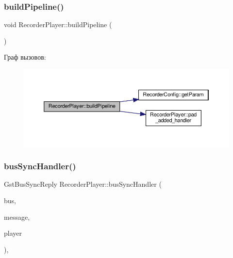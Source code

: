 \subsubsection{\texorpdfstring{build\+Pipeline()}{buildPipeline()}}
{\footnotesize\ttfamily void Recorder\+Player\+::build\+Pipeline (\begin{DoxyParamCaption}{ }\end{DoxyParamCaption})\hspace{0.3cm}{\ttfamily [private]}}

Граф вызовов\+:\nopagebreak
\begin{figure}[H]
\begin{center}
\leavevmode
\includegraphics[width=350pt]{class_recorder_player_a2406c730cc930fb3aa800142c041a950_cgraph}
\end{center}
\end{figure}
\mbox{\label{class_recorder_player_adb7a205e6752a5a88e23f5595508ad98}} 
\subsubsection{\texorpdfstring{bus\+Sync\+Handler()}{busSyncHandler()}}
{\footnotesize\ttfamily Gst\+Bus\+Sync\+Reply Recorder\+Player\+::bus\+Sync\+Handler (\begin{DoxyParamCaption}\item[{Gst\+Bus $\ast$}]{bus,  }\item[{Gst\+Message $\ast$}]{message,  }\item[{\hyperlink{class_recorder_player}{Recorder\+Player} $\ast$}]{player }\end{DoxyParamCaption})\hspace{0.3cm}{\ttfamily [static]}, {\ttfamily [private]}}

\mbox{\label{class_recorder_player_adcdcc7aea5f2b7984b240f961dfcc8a9}} 
